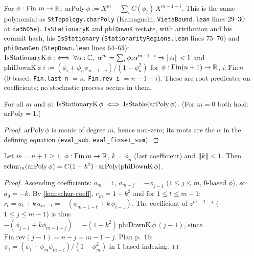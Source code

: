 \begin{definition}\label{def:arPoly}
For $\phi:\mathrm{Fin}\ m\to\mathbb{R}$:
$\mathrm{arPoly}\,\phi:=X^m-\sum_{i}C(\phi_i)\,X^{m-1-i}$. This is the same
polynomial as \texttt{StTopology.charPoly} (Kamaguchi, \texttt{VietaBound.lean}
lines 29--30 at \texttt{da3605e}). \texttt{IsStationaryK} and \texttt{phiDownK}
restate, with attribution and his commit hash, his \texttt{IsStationary}
(\texttt{StationarityRegions.lean} lines 75--76) and \texttt{phiDownGen}
(\texttt{StepDown.lean} lines 64--65):
$\mathrm{IsStationaryK}\,\phi:\iff\forall\alpha:\C,\ \alpha^m=\sum_i\phi_i\alpha^{m-1-i}\Rightarrow\nm\alpha<1$ and
$\mathrm{phiDownK}\,\phi\ i:=(\phi_{i}+\phi_{n}\phi_{n-1-i})/(1-\phi_n^2)$ for
$\phi:\mathrm{Fin}(n+1)\to\mathbb{R}$, $i:\mathrm{Fin}\,n$ (0-based; \texttt{Fin.last n}
$=n$, \texttt{Fin.rev i} $=n-1-i$). These are root predicates on
coefficients; no stochastic process occurs in them.
\end{definition}

\begin{lemma}\label{lem:ar-bridge}
For all $m$ and $\phi$: $\mathrm{IsStationaryK}\,\phi\iff\mathrm{IsStable}(\mathrm{arPoly}\,\phi)$.
(For $m=0$ both hold: $\mathrm{arPoly}=1$.)
\end{lemma}
\begin{proof}
$\mathrm{arPoly}\,\phi$ is monic of degree $m$, hence non-zero; its roots are the
$\alpha$ in the defining equation (\texttt{eval\_sub}, \texttt{eval\_finset\_sum}).
\end{proof}

\begin{lemma}\label{lem:schur-arPoly}
Let $m=n+1\ge1$, $\phi:\mathrm{Fin}\,m\to\mathbb{R}$, $k=\phi_{n}$ (last coefficient) and
$\lVert k \rVert<1$. Then $\mathrm{schur}_m(\mathrm{arPoly}\,\phi)=C(1-k^2)\cdot\mathrm{arPoly}(\mathrm{phiDownK}\,\phi)$.
\end{lemma}
\begin{proof}
Ascending coefficients: $a_m=1$, $a_{m-j}=-\phi_{j-1}$ ($1\le j\le m$, 0-based
$\phi$), so $a_0=-k$. By \ref{lem:schur-coeff}, $r_m=1-k^2$ and for
$1\le t\le m-1$: $r_t=a_t+k\,a_{m-t}=-(\phi_{m-1-t}+k\,\phi_{t-1})$. The
coefficient of $z^{m-1-j}$ ($1\le j\le m-1$) is thus
$-(\phi_{j-1}+k\phi_{m-1-j})=-(1-k^2)\,\mathrm{phiDownK}\,\phi\,(j-1)$, since
$\mathrm{Fin.rev}(j-1)=n-j=m-1-j$. Plan p.~16:
$\psi_i=(\phi_i+\phi_m\phi_{m-i})/(1-\phi_m^2)$ in 1-based indexing.
\end{proof}


